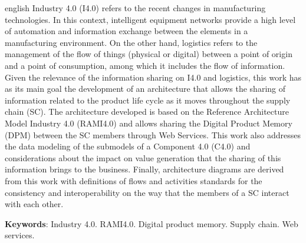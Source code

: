 \begin{resumo}[Abstract]
	\begin{otherlanguage*}{english}
		Industry 4.0 (I4.0) refers to the recent changes in manufacturing technologies. In this context, intelligent equipment networks provide a high level of automation and information exchange between the elements in a manufacturing environment. On the other hand, logistics refers to the management of the flow of things (physical or digital) between a point of origin and a point of consumption, among which it includes the flow of information. Given the relevance of the information sharing on I4.0 and logistics, this work has as its main goal the development of an architecture that allows the sharing of information related to the product life cycle as it moves throughout the supply chain (SC). The architecture developed is based on the Reference Architecture Model Industry 4.0 (RAMI4.0) and allows sharing the Digital Product Memory (DPM) between the SC members through Web Services. This work also addresses the data modeling of the submodels of a Component 4.0 (C4.0) and considerations about the impact on value generation that the sharing of this information brings to the business. Finally, architecture diagrams are derived from this work with definitions of flows and activities standards for the consistency and interoperability on the way that the members of a SC interact with each other.
		\vspace{\onelineskip}

		\noindent
		\textbf{Keywords}: Industry 4.0. RAMI4.0. Digital product memory. Supply chain. Web services.
	\end{otherlanguage*}
\end{resumo}

\listoffigures*
\cleardoublepage

\listoftables*
\cleardoublepage

